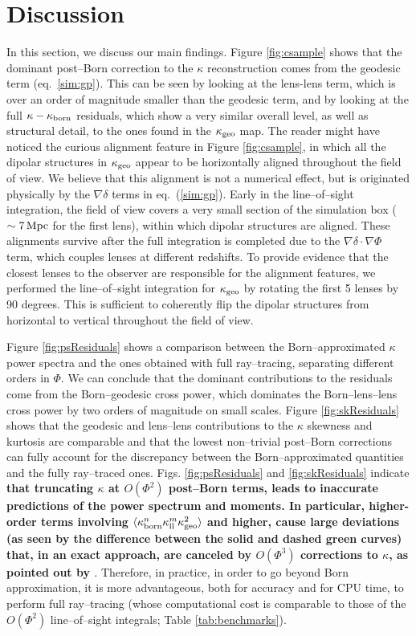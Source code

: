 \documentclass[reprint,aps,prd,superscriptaddress,showkeys,showpacs]{revtex4-1}
\begin{document}
\section{Discussion}
\label{sec:discuss}
% 
In this section, we discuss our main findings. Figure \ref{fig:csample} shows that the dominant post--Born correction to the $\kappa$ reconstruction comes from the geodesic term (eq.~\ref{sim:gp}). This can be seen by looking at the lens-lens term, which is over an order of magnitude smaller than the geodesic term, and by looking at the full $\kappa-\kappa_{\rm born}$ residuals, which show a very similar overall level, as well as structural detail, to the ones found in the $\kappa_{\rm geo}$ map. The reader might have noticed the curious alignment feature in Figure \ref{fig:csample}, in which all the dipolar structures in $\kappa_{\rm geo}$ appear to be horizontally aligned throughout the field of view. We believe that this alignment is not a numerical effect, but is originated physically by the $\nabla\delta$ terms in eq.~(\ref{sim:gp}). Early in the line--of--sight integration, the field of view covers a very small section of the simulation box ($\sim7\,{\rm Mpc}$ for the first lens), within which dipolar structures are aligned. These alignments survive after the full integration is completed due to the $\nabla\delta\cdot\nabla\Phi$ term, which couples lenses at different redshifts. To provide evidence that the closest lenses to the observer are responsible for the alignment features, we performed the line--of--sight integration for $\kappa_{\rm geo}$ by rotating the first 5 lenses by 90 degrees. This is sufficient to coherently flip the dipolar structures from horizontal to vertical throughout the field of view.

Figure \ref{fig:psResiduals} shows a comparison between the Born--approximated $\kappa$ power spectra and the ones obtained with full ray--tracing, separating different orders in $\Phi$. We can conclude that the dominant contributions to the residuals come from the Born--geodesic cross power, which dominates the Born--lens--lens cross power by two orders of magnitude on small scales. Figure \ref{fig:skResiduals} shows that the geodesic and lens--lens contributions to the $\kappa$ skewness and kurtosis are comparable and that the lowest non--trivial post--Born corrections can fully account for the discrepancy between the Born--approximated quantities and the fully ray--traced ones. Figs. \ref{fig:psResiduals} and \ref{fig:skResiduals} indicate \textbf{\color{red} that truncating $\kappa$ at $O(\Phi^2)$ post--Born terms, leads to inaccurate predictions of the power spectrum and moments. In particular, higher-order terms involving $\langle \kappa_{\rm born}^n \kappa_{\rm ll}^m \kappa_{\rm geo}^2\rangle$ and higher, cause large deviations (as seen by the difference between the solid and dashed green curves) that, in an exact approach, are canceled by $O(\Phi^3)$ corrections to $\kappa$, as pointed out by \citep{HirataKrause}}. Therefore, in practice, in order to go beyond Born approximation, it is more advantageous, both for accuracy and for CPU time, to perform full ray--tracing (whose computational cost is comparable to those of the $O(\Phi^2)$ line--of--sight integrals; Table \ref{tab:benchmarks}).
\end{document}
